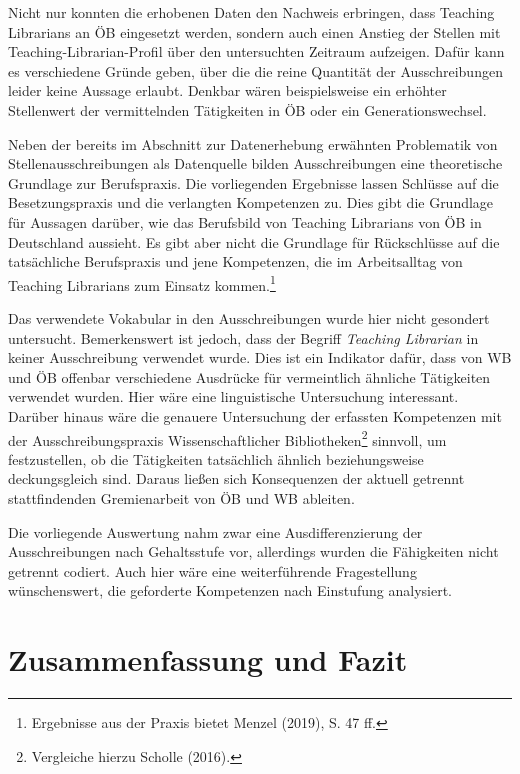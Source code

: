 \documentclass[a4paper,
fontsize=11pt,
oneside,
numbers=noperiodatend,
parskip=half-,
bibliography=totoc,
final
]{scrartcl}
\begin{document}
Nicht nur konnten die erhobenen Daten den Nachweis erbringen, dass
Teaching Librarians an ÖB eingesetzt werden, sondern auch einen Anstieg
der Stellen mit Teaching-Librarian-Profil über den untersuchten Zeitraum
aufzeigen. Dafür kann es verschiedene Gründe geben, über die die reine
Quantität der Ausschreibungen leider keine Aussage erlaubt. Denkbar
wären beispielsweise ein erhöhter Stellenwert der vermittelnden
Tätigkeiten in ÖB oder ein Generationswechsel.

Neben der bereits im Abschnitt zur Datenerhebung erwähnten Problematik
von Stellenausschreibungen als Datenquelle bilden Ausschreibungen eine
theoretische Grundlage zur Berufspraxis. Die vorliegenden Ergebnisse
lassen Schlüsse auf die Besetzungspraxis und die verlangten Kompetenzen
zu. Dies gibt die Grundlage für Aussagen darüber, wie das Berufsbild von
Teaching Librarians von ÖB in Deutschland aussieht. Es gibt aber nicht
die Grundlage für Rückschlüsse auf die tatsächliche Berufspraxis und
jene Kompetenzen, die im Arbeitsalltag von Teaching Librarians zum
Einsatz kommen.\footnote{Ergebnisse aus der Praxis bietet Menzel (2019),
  S. 47 ff.}

Das verwendete Vokabular in den Ausschreibungen wurde hier nicht
gesondert untersucht. Bemerkenswert ist jedoch, dass der Begriff
\emph{Teaching Librarian} in keiner Ausschreibung verwendet wurde. Dies
ist ein Indikator dafür, dass von WB und ÖB offenbar verschiedene
Ausdrücke für vermeintlich ähnliche Tätigkeiten verwendet wurden. Hier
wäre eine linguistische Untersuchung interessant. Darüber hinaus wäre
die genauere Untersuchung der erfassten Kompetenzen mit der
Ausschreibungspraxis Wissenschaftlicher Bibliotheken\footnote{Vergleiche
  hierzu Scholle (2016).} sinnvoll, um festzustellen, ob die Tätigkeiten
tatsächlich ähnlich beziehungsweise deckungsgleich sind. Daraus ließen
sich Konsequenzen der aktuell getrennt stattfindenden Gremienarbeit von
ÖB und WB ableiten.

Die vorliegende Auswertung nahm zwar eine Ausdifferenzierung der
Ausschreibungen nach Gehaltsstufe vor, allerdings wurden die Fähigkeiten
nicht getrennt codiert. Auch hier wäre eine weiterführende Fragestellung
wünschenswert, die geforderte Kompetenzen nach Einstufung analysiert.

\hypertarget{zusammenfassung-und-fazit}{%
\section{Zusammenfassung und
Fazit}\label{zusammenfassung-und-fazit}}
\end{document}
